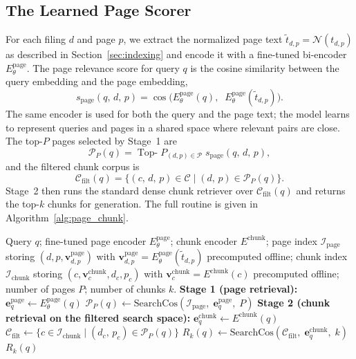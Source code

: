 \documentclass[12pt,twoside,maitrise]{dms}
\theoremstyle{definition}
\numberwithin{equation}{section}
\numberwithin{table}{chapter}
\numberwithin{figure}{chapter}
\begin{document}
\subsection{The Learned Page Scorer}

For each filing $d$ and page $p$, we extract the normalized page text
$\tilde{t}_{d,p} = \mathcal{N}(t_{d,p})$ as described in Section~\ref{sec:indexing} and
encode it with a fine-tuned bi-encoder $E_\theta^{\text{page}}$. The page relevance
score for query $q$ is the cosine similarity between the query embedding and the page
embedding,
\begin{equation}
  s_{\text{page}}(q,\, d,\, p) =
  \cos\!\bigl(E_\theta^{\text{page}}(q),\;\; E_\theta^{\text{page}}(\tilde{t}_{d,p})\bigr).
  \label{eq:page_score}
\end{equation}
The same encoder is used for both the query and the page text; the model learns to
represent queries and pages in a shared space where relevant pairs are close. The top-$P$
pages selected by Stage~1 are
\begin{equation}
  \mathcal{P}_P(q) = \operatorname{Top\text{-}}P_{(d,p)\in\mathcal{P}} \; s_{\text{page}}(q,\, d,\, p),
\end{equation}
and the filtered chunk corpus is
\begin{equation}
  \mathcal{C}_{\text{filt}}(q) = \{(c,\, d,\, p) \in \mathcal{C} \mid (d,\, p) \in \mathcal{P}_P(q)\}.
\end{equation}
Stage~2 then runs the standard dense chunk retriever over $\mathcal{C}_{\text{filt}}(q)$
and returns the top-$k$ chunks for generation. The full routine is given in
Algorithm~\ref{alg:page_chunk}.

\begin{algorithm}[ht]
\caption{Page-then-chunk retrieval with the learned page scorer.}
\label{alg:page_chunk}
\begin{algorithmic}[1]
\REQUIRE Query $q$; fine-tuned page encoder $E_\theta^{\text{page}}$; chunk encoder
$E^{\text{chunk}}$; page index $\mathcal{I}_{\text{page}}$ storing $(d,p,\mathbf{v}^{\text{page}}_{d,p})$
with $\mathbf{v}^{\text{page}}_{d,p} = E_\theta^{\text{page}}(\tilde{t}_{d,p})$ precomputed
offline; chunk index $\mathcal{I}_{\text{chunk}}$ storing $(c, \mathbf{v}^{\text{chunk}}_c, d_c, p_c)$
with $\mathbf{v}^{\text{chunk}}_c = E^{\text{chunk}}(c)$ precomputed offline; number of pages $P$;
number of chunks $k$.
\STATE \textbf{Stage 1 (page retrieval):}
\STATE $\mathbf{e}^{\text{page}}_q \leftarrow E_\theta^{\text{page}}(q)$
\STATE $\mathcal{P}_P(q) \leftarrow \text{SearchCos}(\mathcal{I}_{\text{page}},\; \mathbf{e}^{\text{page}}_q,\; P)$
\STATE \textbf{Stage 2 (chunk retrieval on the filtered search space):}
\STATE $\mathbf{e}^{\text{chunk}}_q \leftarrow E^{\text{chunk}}(q)$
\STATE $\mathcal{C}_{\text{filt}} \leftarrow \{c \in \mathcal{I}_{\text{chunk}} \mid (d_c,\, p_c) \in \mathcal{P}_P(q)\}$
\STATE $R_k(q) \leftarrow \text{SearchCos}(\mathcal{C}_{\text{filt}},\; \mathbf{e}^{\text{chunk}}_q,\; k)$
\RETURN $R_k(q)$
\end{algorithmic}
\end{algorithm}
\end{document}
